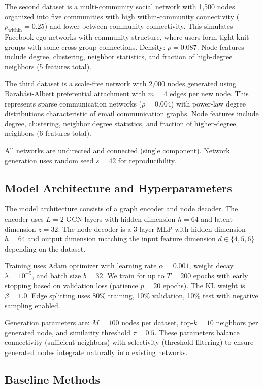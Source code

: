 \documentclass[12pt]{article}
\begin{document}
The second dataset is a multi-community social network with 1,500 nodes organized into five communities with high within-community connectivity ($p_{\text{within}} = 0.25$) and lower between-community connectivity. This simulates Facebook ego networks with community structure, where users form tight-knit groups with some cross-group connections. Density: $\rho = 0.087$. Node features include degree, clustering, neighbor statistics, and fraction of high-degree neighbors (5 features total).

The third dataset is a scale-free network with 2,000 nodes generated using Barabási-Albert preferential attachment with $m=4$ edges per new node. This represents sparse communication networks ($\rho = 0.004$) with power-law degree distributions characteristic of email communication graphs. Node features include degree, clustering, neighbor degree statistics, and fraction of higher-degree neighbors (6 features total).

All networks are undirected and connected (single component). Network generation uses random seed $s=42$ for reproducibility.

\subsection{Model Architecture and Hyperparameters}

The model architecture consists of a graph encoder and node decoder. The encoder uses $L=2$ GCN layers with hidden dimension $h=64$ and latent dimension $z=32$. The node decoder is a 3-layer MLP with hidden dimension $h=64$ and output dimension matching the input feature dimension $d \in \{4, 5, 6\}$ depending on the dataset.

Training uses Adam optimizer with learning rate $\alpha = 0.001$, weight decay $\lambda = 10^{-5}$, and batch size $b = 32$. We train for up to $T=200$ epochs with early stopping based on validation loss (patience $p=20$ epochs). The KL weight is $\beta = 1.0$. Edge splitting uses 80\% training, 10\% validation, 10\% test with negative sampling enabled.

Generation parameters are: $M=100$ nodes per dataset, top-$k=10$ neighbors per generated node, and similarity threshold $\tau = 0.5$. These parameters balance connectivity (sufficient neighbors) with selectivity (threshold filtering) to ensure generated nodes integrate naturally into existing networks.

\subsection{Baseline Methods}
\end{document}
